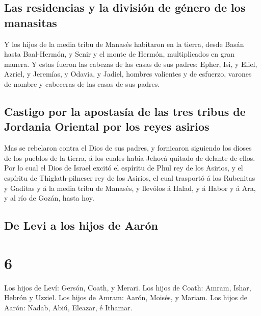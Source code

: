 \hypertarget{las-residencias-y-la-divisiuxf3n-de-guxe9nero-de-los-manasitas}{%
\subsection{Las residencias y la división de género de los
manasitas}\label{las-residencias-y-la-divisiuxf3n-de-guxe9nero-de-los-manasitas}}

 Y los hijos de la media tribu de Manasés habitaron en la
tierra, desde Basán hasta Baal-Hermón, y Senir y el monte de Hermón,
multiplicados en gran manera.  Y estas fueron las cabezas
de las casas de sus padres: Epher, Isi, y Eliel, Azriel, y Jeremías, y
Odavia, y Jadiel, hombres valientes y de esfuerzo, varones de nombre y
cabeceras de las casas de sus padres.

\hypertarget{castigo-por-la-apostasuxeda-de-las-tres-tribus-de-jordania-oriental-por-los-reyes-asirios}{%
\subsection{Castigo por la apostasía de las tres tribus de Jordania
Oriental por los reyes
asirios}\label{castigo-por-la-apostasuxeda-de-las-tres-tribus-de-jordania-oriental-por-los-reyes-asirios}}

 Mas se rebelaron contra el Dios de sus padres, y
fornicaron siguiendo los dioses de los pueblos de la tierra, á los
cuales había Jehová quitado de delante de ellos.  Por lo
cual el Dios de Israel excitó el espíritu de Phul rey de los Asirios, y
el espíritu de Thiglath-pilneser rey de los Asirios, el cual trasportó á
los Rubenitas y Gaditas y á la media tribu de Manasés, y llevólos á
Halad, y á Habor y á Ara, y al río de Gozán, hasta hoy.

\hypertarget{de-levi-a-los-hijos-de-aaruxf3n}{%
\subsection{De Levi a los hijos de
Aarón}\label{de-levi-a-los-hijos-de-aaruxf3n}}

\hypertarget{section-5}{%
\section{6}\label{section-5}}

 Los hijos de Leví: Gersón, Coath, y Merari. 
Los hijos de Coath: Amram, Ishar, Hebrón y Uzziel.  Los
hijos de Amram: Aarón, Moisés, y Mariam. Los hijos de Aarón: Nadab,
Abiú, Eleazar, é Ithamar.

